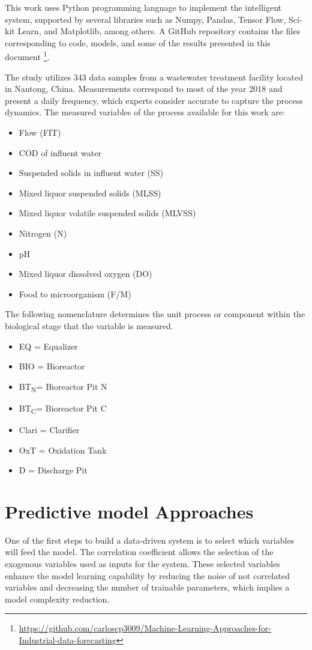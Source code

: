 This work uses Python programming language to implement the intelligent system, supported by several libraries such as Numpy, Pandas, Tensor Flow, Sci-kit Learn, and Matplotlib, among others. A GitHub repository contains the files corresponding to code, models, and some of the results presented in this document \footnote{\url{https://github.com/carloscp3009/Machine-Learning-Approaches-for-Industrial-data-forecasting}}. 

The study utilizes 343 data samples from a wastewater treatment facility located in Nantong, China. Measurements correspond to most of the year 2018 and present a daily frequency, which experts consider accurate to capture the process dynamics. The measured variables of the process available for this work are:

\begin{itemize}
 \item	Flow (FIT)
 \item	COD of influent water
 \item	Suspended solids in influent water (SS)
 \item	Mixed liquor suspended solids (MLSS)
 \item	Mixed liquor volatile suspended solids (MLVSS)
 \item	Nitrogen (N)
 \item	pH
 \item	Mixed liquor dissolved oxygen (DO)
 \item	Food to microorganism (F/M)
\end{itemize}

The following nomenclature determines the unit process or component within the biological stage that the variable is measured.

\begin{itemize}
 \item	EQ = Equalizer
 \item	BIO = Bioreactor
 \item	BT\textsubscript{N}= Bioreactor Pit N
 \item	BT\textsubscript{C}= Bioreactor Pit C
 \item	Clari = Clarifier
 \item	OxT = Oxidation Tank
 \item	D = Discharge Pit
\end{itemize}

\section{Predictive model Approaches}
\label{s:model-design}
One of the first steps to build a data-driven system is to select which variables will feed the model. The correlation coefficient allows the selection of the exogenous variables used as inputs for the system. These selected variables enhance the model learning capability by reducing the noise of not correlated variables and decreasing the number of trainable parameters, which implies a model complexity reduction. 

